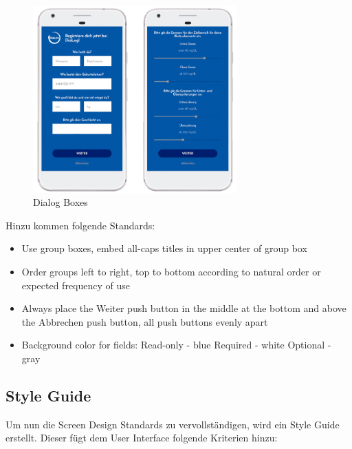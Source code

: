 \begin{figure}[H]
	\centering
	\includegraphics[width=0.7\textwidth]{images/DialogBox.png}
	\captionsetup{justification=centering}
	\caption{Dialog Boxes}
	\label{img:dialogbox}
\end{figure}
Hinzu kommen folgende Standards:
\begin{itemize}
	\item Use group boxes, embed all-caps titles in upper center of group box
	\item Order groups left to right, top to bottom according to natural order or expected frequency of use
	\item Always place the Weiter push button in the middle at the bottom and above the Abbrechen push button, all push buttons evenly apart
	\item Background color for fields:\newline
		\noindent\hspace*{30mm}Read-only - blue \newline
		\noindent\hspace*{30mm}Required - white \newline
		\noindent\hspace*{30mm}Optional - gray 
\end{itemize}

\subsection{Style Guide}
Um nun die Screen Design Standards zu vervollständigen, wird ein Style Guide erstellt. Dieser fügt dem User Interface folgende Kriterien hinzu:\\